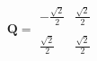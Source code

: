 \documentclass[preview]{standalone}
\begin{document}
\begin{align*}
\mathbf{Q} = \begin{matrix}-\frac{\sqrt{2}}{2} & \frac{\sqrt{2}}{2} \\ \\\frac{\sqrt{2}}{2} & \frac{\sqrt{2}}{2}\end{matrix}
\end{align*}
\end{document}
